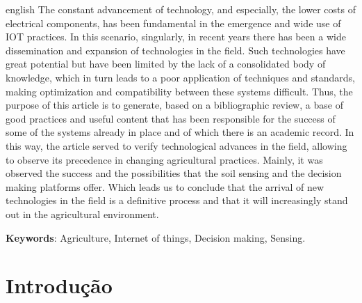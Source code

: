 \documentclass[
article,			%
12pt,				%
oneside,			%
a4paper,			%
english,			%
brazil,				%
sumario=tradicional
]{abntex2}
\begin{document}
\renewcommand{\resumoname}{Abstract}
\begin{resumoumacoluna}
  \begin{otherlanguage*}{english}
    The constant advancement of technology, and especially, the lower costs of electrical components, has been fundamental in the emergence and wide use of IOT practices. In this scenario, singularly, in recent years there has been a wide dissemination and expansion of technologies in the field. Such technologies have great potential but have been limited by the lack of a consolidated body of knowledge, which in turn leads to a poor application of techniques and standards, making optimization and compatibility between these systems difficult. Thus, the purpose of this article is to generate, based on a bibliographic review, a base of good practices and useful content that has been responsible for the success of some of the systems already in place and of which there is an academic record. In this way, the article served to verify technological advances in the field, allowing to observe its precedence in changing agricultural practices. Mainly, it was observed the success and the possibilities that the soil sensing and the decision making platforms offer. Which leads us to conclude that the arrival of new technologies in the field is a definitive process and that it will increasingly stand out in the agricultural environment.
    \vspace{\onelineskip}
    \noindent

    \textbf {Keywords}: Agriculture, Internet of things, Decision making, Sensing.
  \end{otherlanguage*}  
\end{resumoumacoluna}



\textual
\section{Introdução}
\end{document}
